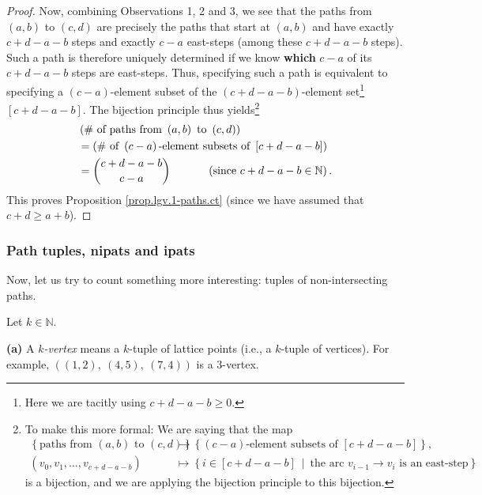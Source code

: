 \begin{definition}
\begin{proof}
Now, combining Observations 1, 2 and 3, we see that the paths from $\left(
a,b\right)  $ to $\left(  c,d\right)  $ are precisely the paths that start at
$\left(  a,b\right)  $ and have exactly $c+d-a-b$ steps and exactly $c-a$
east-steps (among these $c+d-a-b$ steps). Such a path is therefore uniquely
determined if we know \textbf{which} $c-a$ of its $c+d-a-b$ steps are
east-steps. Thus, specifying such a path is equivalent to specifying a
$\left(  c-a\right)  $-element subset of the $\left(  c+d-a-b\right)
$-element set\footnote{Here we are tacitly using $c+d-a-b\geq0$.} $\left[
c+d-a-b\right]  $. The bijection principle thus yields\footnote{To make this
more formal: We are saying that the map
\begin{align*}
\left\{  \text{paths from }\left(  a,b\right)  \text{ to }\left(  c,d\right)
\right\}   &  \rightarrow\left\{  \left(  c-a\right)  \text{-element subsets
of }\left[  c+d-a-b\right]  \right\}  ,\\
\left(  v_{0},v_{1},\ldots,v_{c+d-a-b}\right)   &  \mapsto\left\{  i\in\left[
c+d-a-b\right]  \ \mid\ \text{the arc }v_{i-1}\rightarrow v_{i}\text{ is an
east-step}\right\}
\end{align*}
is a bijection, and we are applying the bijection principle to this
bijection.}%
\begin{align*}
&  \left(  \text{\# of paths from }\left(  a,b\right)  \text{ to }\left(
c,d\right)  \right) \\
&  =\left(  \text{\# of }\left(  c-a\right)  \text{-element subsets of
}\left[  c+d-a-b\right]  \right) \\
&  =\dbinom{c+d-a-b}{c-a}\ \ \ \ \ \ \ \ \ \ \left(  \text{since }%
c+d-a-b\in\mathbb{N}\right)  .
\end{align*}
This proves Proposition \ref{prop.lgv.1-paths.ct} (since we have assumed that
$c+d\geq a+b$).
\end{proof}

\subsubsection{Path tuples, nipats and ipats}

Now, let us try to count something more interesting: tuples of
non-intersecting paths.

\begin{definition}
\label{def.lgv.path-tups}Let $k\in\mathbb{N}$. \medskip

\textbf{(a)} A $k$\emph{-vertex} means a $k$-tuple of lattice points (i.e., a
$k$-tuple of vertices). For example, $\left(  \left(  1,2\right)  ,\ \left(
4,5\right)  ,\ \left(  7,4\right)  \right)  $ is a $3$-vertex. \medskip


\end{definition}
\end{definition}
